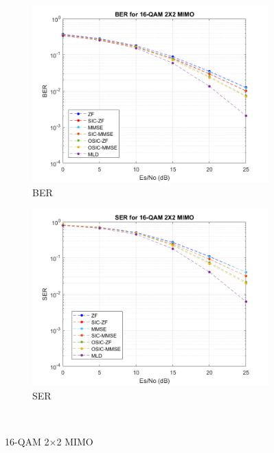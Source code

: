 \documentclass{article}
\begin{document}
\begin{figure}[H]
	\centering
	\begin{subfigure}{0.5\textwidth}
		\centerline{\includegraphics[width=1\textwidth]{BER_2x2_16qam.png}}
		\caption{BER}
	\end{subfigure}%
	\begin{subfigure}{0.5\textwidth}
		\centerline{\includegraphics[width=1\textwidth]{SER_2x2_16qam.png}}
		\caption{SER}
	\end{subfigure}\\%
	\caption{16-QAM 2$\times$2 MIMO}
\end{figure}
\end{document}
